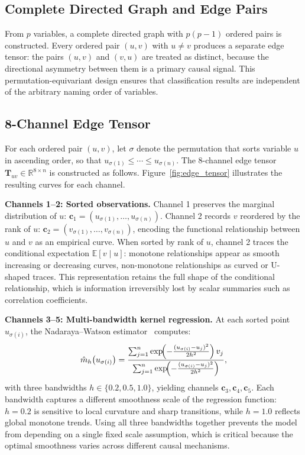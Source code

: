 \subsection{Complete Directed Graph and Edge Pairs}

From $p$ variables, a complete directed graph with $p(p-1)$ ordered pairs is constructed. Every ordered pair $(u, v)$ with $u \neq v$ produces a separate edge tensor: the pairs $(u, v)$ and $(v, u)$ are treated as distinct, because the directional asymmetry between them is a primary causal signal. This permutation-equivariant design ensures that classification results are independent of the arbitrary naming order of variables.

\subsection{8-Channel Edge Tensor}
\label{sec:8channel_tensor}

For each ordered pair $(u, v)$, let $\sigma$ denote the permutation that sorts variable $u$ in ascending order, so that $u_{\sigma(1)} \leq \cdots \leq u_{\sigma(n)}$. The 8-channel edge tensor $\mathbf{T}_{uv} \in \mathbb{R}^{8 \times n}$ is constructed as follows. Figure~\ref{fig:edge_tensor} illustrates the resulting curves for each channel.

\textbf{Channels 1--2: Sorted observations.} Channel 1 preserves the marginal distribution of $u$: $\mathbf{c}_1 = (u_{\sigma(1)},\ldots,u_{\sigma(n)})$. Channel 2 records $v$ reordered by the rank of $u$: $\mathbf{c}_2 = (v_{\sigma(1)},\ldots,v_{\sigma(n)})$, encoding the functional relationship between $u$ and $v$ as an empirical curve. When sorted by rank of $u$, channel 2 traces the conditional expectation $\mathbb{E}[v \mid u]$: monotone relationships appear as smooth increasing or decreasing curves, non-monotone relationships as curved or U-shaped traces. This representation retains the full shape of the conditional relationship, which is information irreversibly lost by scalar summaries such as correlation coefficients.

\textbf{Channels 3--5: Multi-bandwidth kernel regression.} At each sorted point $u_{\sigma(i)}$, the Nadaraya--Watson estimator~\cite{nadaraya1964, watson1964} computes:
\begin{equation}
\hat{m}_h\!\left(u_{\sigma(i)}\right) = \frac{\sum_{j=1}^{n}\exp\!\Bigl(-\frac{(u_{\sigma(i)}-u_j)^2}{2h^2}\Bigr)\,v_j}{\sum_{j=1}^{n}\exp\!\Bigl(-\frac{(u_{\sigma(i)}-u_j)^2}{2h^2}\Bigr)},
\label{eq:nadaraya}
\end{equation}
with three bandwidths $h \in \{0.2,0.5,1.0\}$, yielding channels $\mathbf{c}_3, \mathbf{c}_4, \mathbf{c}_5$. Each bandwidth captures a different smoothness scale of the regression function: $h = 0.2$ is sensitive to local curvature and sharp transitions, while $h = 1.0$ reflects global monotone trends. Using all three bandwidths together prevents the model from depending on a single fixed scale assumption, which is critical because the optimal smoothness varies across different causal mechanisms.

